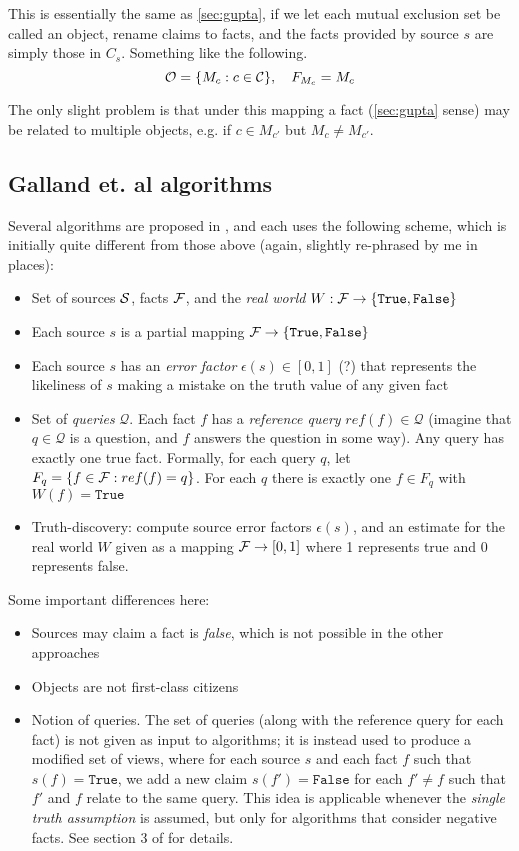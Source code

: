 \documentclass[../main.tex]{subfiles}
\begin{document}
This is essentially the same as \ref{sec:gupta}, if we let each mutual
exclusion set be called an object, rename claims to facts, and the facts
provided by source $s$ are simply those in $C_s$. Something like the following.
$$
\O = \{M_c : c \in \mathcal{C}\},
\quad
F_{M_c} = M_c
$$

The only slight problem is that under this mapping a fact (\ref{sec:gupta}
sense) may be related to multiple objects, e.g. if $c \in M_{c'}$ but $M_c \ne
M_{c'}$.

\subsection{Galland et. al algorithms}
\label{sec:galland}

Several algorithms are proposed in \cite{galland}, and each uses the following
scheme, which is initially quite different from those above (again, slightly
re-phrased by me in places):

\begin{itemize}
\item Set of sources $\S$, facts $\F$, and the \emph{real world}
$W: \F \rightarrow \{\texttt{True}, \texttt{False}\}$
\item Each source $s$ is a partial mapping $\F \rightarrow
\{\texttt{True}, \texttt{False}\}$
\item Each source $s$ has an \emph{error factor} $\epsilon(s) \in [0, 1]$ (?)
that represents the likeliness of $s$ making a mistake on the truth value of
any given fact
\item Set of \emph{queries} $\mathcal{Q}$. Each fact $f$ has a \emph{reference
query} $ref(f) \in \mathcal{Q}$ (imagine that $q\in\mathcal{Q}$ is a question,
and $f$ answers the question in some way). Any query has exactly one true fact.
Formally, for each query $q$, let $F_q = \{f \in \F : ref(f) = q\}$.
For each $q$ there is exactly one $f \in F_q$ with $W(f) = \texttt{True}$ \item
Truth-discovery: compute source error factors $\epsilon(s)$, and an estimate
for the real world $W$ given as a mapping $\F \rightarrow [0, 1]$ where 1
represents true and 0 represents false.
\end{itemize}

Some important differences here:
\begin{itemize}
\item Sources may claim a fact is \emph{false}, which is not possible in the
other approaches
\item Objects are not first-class citizens
\item Notion of queries. The set of queries (along with the reference query for
each fact) is not given as input to algorithms; it is instead used to produce a
modified set of views, where for each source $s$ and each fact $f$ such that
$s(f) = \texttt{True}$, we add a new claim $s(f')=\texttt{False}$ for each
$f' \ne f$ such that $f'$ and $f$ relate to the same query. This idea is
applicable whenever the \emph{single truth assumption} is assumed, but only for
algorithms that consider negative facts. See section 3 of \cite{galland} for
details.
\end{itemize}
\end{document}

